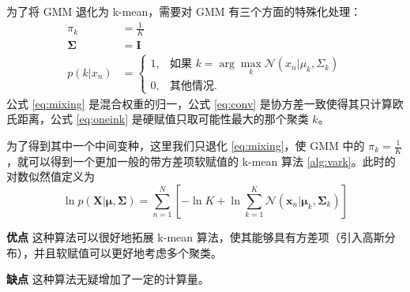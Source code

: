     \begin{solution}
        为了将 GMM 退化为 k-mean，需要对 GMM 有三个方面的特殊化处理：
        \begin{align}
            \pi_k &= \frac{1}{K} \label{eq:mixing}\\
            \bm{\Sigma} &= \bm{I} \label{eq:conv} \\
            p(k|x_n) &= \begin{cases}
                1, & \text{如果 }k=\arg\max_k\mathcal{N}(x_n|\mu_k,\Sigma_k) \\
                0, & \text{其他情况.}
            \end{cases} \label{eq:oneink}
        \end{align}
        公式 \eqref{eq:mixing} 是混合权重的归一，公式 \eqref{eq:conv} 是协方差一致使得其只计算欧氏距离，公式 \eqref{eq:oneink} 是硬赋值只取可能性最大的那个聚类 $k$。

        为了得到其中一个中间变种，这里我们只退化 \eqref{eq:mixing}，使 GMM 中的 $\pi_k=\frac{1}{K}$，就可以得到一个更加一般的带方差项软赋值的 k-mean 算法 \ref{alg:vark}。此时的对数似然值定义为
        \begin{equation}\label{eq:loglike}
            \ln p(\bm{X}|\bm{\mu},\bm{\Sigma})=\sum_{n=1}^N\left[-\ln K + \ln\sum_{k=1}^K\mathcal{N}(\bm{x}_n|\bm{\mu}_k,\bm{\Sigma}_k)\right]
        \end{equation}

        \textbf{优点} 这种算法可以很好地拓展 k-mean 算法，使其能够具有方差项（引入高斯分布），并且软赋值可以更好地考虑多个聚类。
        
        \textbf{缺点} 这种算法无疑增加了一定的计算量。
    \end{solution}

